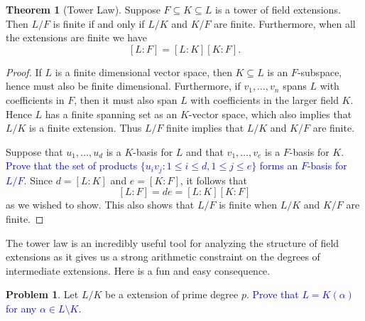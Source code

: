 \documentclass[11pt]{article}
\theoremstyle{definition}
\newtheorem{theorem}{Theorem}[section]
\newtheorem{problem}{Problem}[section]
\numberwithin{equation}{subsection}
\newcommand{\blue}[1]{\textcolor{blue}{#1}}
\begin{document}
\begin{theorem}[Tower Law]
    Suppose $F \subseteq K \subseteq L$ is a tower of field extensions.
    Then $L/F$ is finite if and only if $L/K$ and $K/F$ are finite.
    Furthermore, when all the extensions are finite we have
    \[
        [L : F] = [L : K][K : F].
    \]
\end{theorem}

\begin{proof}
    If $L$ is a finite dimensional vector space, then $K \subseteq L$ is an $F$-subspace, hence must also be finite dimensional.
    Furthermore, if $v_1,\ldots, v_n$ spans $L$ with coefficients in $F$, then it must also span $L$ with coefficients in the larger field $K$.
    Hence $L$ has a finite spanning set as an $K$-vector space, which also implies that $L/K$ is a finite extension.
    Thus $L/F$ finite implies that $L/K$ and $K/F$ are finite.

    Suppose that $u_1,\ldots, u_d$ is a $K$-basis for $L$ and that $v_1,\ldots, v_e$ is a $F$-basis for $K$.
    \blue{Prove that the set of products $\{u_iv_j : 1 \leq i \leq d, 1 \leq j \leq e\}$ forms an $F$-basis for $L/F$.}
    Since $d = [L : K]$ and $e = [K : F]$, it follows that
    \[
        [L : F] = de = [L : K][K : F]
    \]
    as we wished to show.
    This also shows that $L/F$ is finite when $L/K$ and $K/F$ are finite.
\end{proof}

The tower law is an incredibly useful tool for analyzing the structure of field extensions as it gives us a strong arithmetic constraint on the degrees of intermediate extensions.
Here is a fun and easy consequence.

\begin{problem}
\label{prob: prime degree}
    Let $L/K$ be a extension of prime degree $p$.
    \blue{Prove that $L = K(\alpha)$ for any $\alpha \in L \setminus K$.}
\end{problem}
\end{document}

